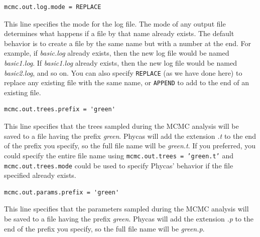 \documentclass[10pt]{article}
\newcommand{\pathname}[1]{{\em #1}}				%
\newcommand{\code}[1]{{\tt #1}}					%
\begin{document}
\begin{samepage}
\begin{verbatim}
mcmc.out.log.mode = REPLACE
\end{verbatim}
This line specifies the mode for the log file. The mode of any output file determines what happens if a file by that name already exists. The default behavior is to create a file by the same name but with a number at the end. For example, if \pathname{basic.log} already exists, then the new log file would be named \pathname{basic1.log}. If \pathname{basic1.log} already exists, then the new log file would be named \pathname{basic2.log}, and so on. You can also specify \code{REPLACE} (as we have done here) to replace any existing file with the same name, or \code{APPEND} to add to the end of an existing file. 
\end{samepage}

\begin{samepage}
\begin{verbatim}
mcmc.out.trees.prefix = 'green'
\end{verbatim}
This line specifies that the trees sampled during the MCMC analysis will be saved to a file having the prefix \pathname{green}. Phycas will add the extension \pathname{.t} to the end of the prefix you specify, so the full file name will be \pathname{green.t}. If you preferred, you could specify the entire file name using \code{mcmc.out.trees = 'green.t'} and \code{mcmc.out.trees.mode} could be used to specify Phycas' behavior if the file specified already exists.
\end{samepage}

\begin{samepage}
\begin{verbatim}
mcmc.out.params.prefix = 'green'
\end{verbatim}
This line specifies that the parameters sampled during the MCMC analysis will be saved to a file having the prefix \pathname{green}. Phycas will add the extension \pathname{.p} to the end of the prefix you specify, so the full file name will be \pathname{green.p}. 
\end{samepage}
\end{document}
